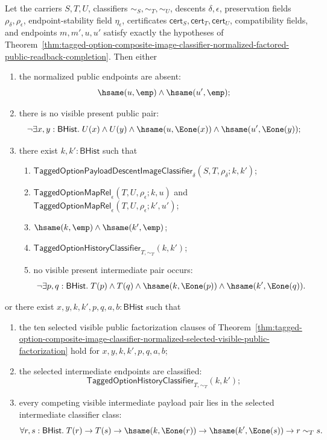 \begin{theorem}
Let the carriers $S,T,U$, classifiers $\sim_S,\sim_T,\sim_U$, descents
$\delta,\epsilon$, preservation fields $\rho_{\delta},\rho_{\epsilon}$,
endpoint-stability field $\eta_{\epsilon}$, certificates
$\mathsf{cert}_S,\mathsf{cert}_T,\mathsf{cert}_U$, compatibility fields, and
endpoints $m,m',u,u'$ satisfy exactly the hypotheses of
Theorem~\ref{thm:tagged-option-composite-image-classifier-normalized-factored-public-readback-completion}.
Then either
\begin{enumerate}
\item the normalized public endpoints are absent:
$$
\hsame(u,\emp)\land \hsame(u',\emp);
$$
\item there is no visible present public pair:
$$
\neg\exists x,y:\mathsf{BHist}.\;
U(x)\land U(y)\land
\hsame(u,\Eone(x))\land
\hsame(u',\Eone(y));
$$
\item there exist $k,k':\mathsf{BHist}$ such that
\begin{enumerate}
\item $\mathsf{TaggedOptionPayloadDescentImageClassifier}_{\delta}
(S,T,\rho_{\delta};k,k')$;
\item $\mathsf{TaggedOptionMapRel}_{\epsilon}(T,U,\rho_{\epsilon};k,u)$ and
$\mathsf{TaggedOptionMapRel}_{\epsilon}(T,U,\rho_{\epsilon};k',u')$;
\item $\hsame(k,\emp)\land \hsame(k',\emp)$;
\item $\mathsf{TaggedOptionHistoryClassifier}_{T,\sim_T}(k,k')$;
\item no visible present intermediate pair occurs:
$$
\neg\exists p,q:\mathsf{BHist}.\;
T(p)\land T(q)\land
\hsame(k,\Eone(p))\land
\hsame(k',\Eone(q)).
$$
\end{enumerate}
\end{enumerate}
or there exist $x,y,k,k',p,q,a,b:\mathsf{BHist}$ such that
\begin{enumerate}
\item the ten selected visible public factorization clauses of
Theorem~\ref{thm:tagged-option-composite-image-classifier-normalized-selected-visible-public-factorization}
hold for $x,y,k,k',p,q,a,b$;
\item the selected intermediate endpoints are classified:
$$
\mathsf{TaggedOptionHistoryClassifier}_{T,\sim_T}(k,k');
$$
\item every competing visible intermediate payload pair lies in the selected
intermediate classifier class:
$$
\forall r,s:\mathsf{BHist}.\;
T(r)\to T(s)\to
\hsame(k,\Eone(r))\to
\hsame(k',\Eone(s))\to r\sim_T s.
$$
\end{enumerate}
\end{theorem}
